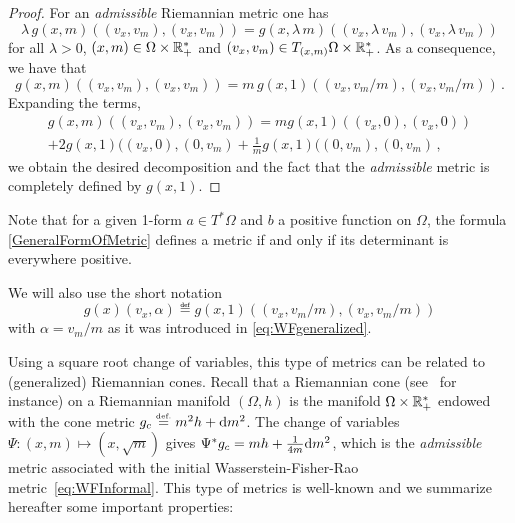 \begin{proof}
For an \emph{admissible} Riemannian metric one has
\begin{equation}\label{BiInvariance}
\lambda\,g(x,m)((v_x,v_m),(v_x,v_m)) = g(x,\lambda\,m)((v_x,\lambda\,v_m),(v_x,\lambda\,v_m))
\end{equation}
for all $\lambda>0$, $(x,m) \in \Omega \times \mathbb{R}_+^*$ and $(v_x,v_m) \in T_{(x,m)} \Omega \times \mathbb{R}_+^*$.
As a consequence, we have that 
\begin{equation}\label{CaracterisationAdmissibleMetrics}
g(x,m)((v_x,v_m),(v_x,v_m))= m\,g(x,1)((v_x,v_m/m),(v_x,v_m/m))\,.
\end{equation}
Expanding the terms,
\begin{multline}
g(x,m)((v_x,v_m),(v_x,v_m)) = m g(x,1)((v_x,0),(v_x,0)) \\+ 2g(x,1)((v_x,0),(0,v_m) + \frac 1 m g(x,1)((0,v_m),(0,v_m)\,,
\end{multline}
we obtain the desired decomposition and the fact that the \textit{admissible} metric is completely defined by $g(x,1)$.\end{proof}
Note that for a given 1-form $a \in T^*\Omega$ and $b$ a positive function on $\Omega$, the formula \eqref{GeneralFormOfMetric} defines a metric if and only if its determinant is everywhere positive.



We will also use the short notation 
\begin{equation}   \label{ShortNotation}
g(x)(v_x,\alpha) \eqdef g(x,1)((v_x,v_m/m),(v_x,v_m/m))
\end{equation}
with $\alpha = v_m/m$ as it was introduced in \eqref{eq:WFgeneralized}. %


Using a square root change of variables, this type of metrics can be related to (generalized) Riemannian cones. Recall that a Riemannian cone (see~\cite{Gallot1979,MetricGeometryBurago} for instance) on a Riemannian manifold $(\Omega,h)$ is the manifold $\Omega \times \mathbb{R}_+^*$ endowed with the cone metric $g_c \stackrel{\mbox{\upshape\tiny def.}}{=} m^2 h + \mathrm{d} m^2$. The change of variables $\Psi: (x,m) \mapsto (x,\sqrt{m})$ gives  $\Psi^*g_c= m h + \frac 1{4m}\mathrm{d} m^2$, which is the \textit{admissible} metric associated with the initial Wasserstein-Fisher-Rao metric~\eqref{eq:WFInformal}. This type of metrics is well-known and we summarize hereafter some important properties:



